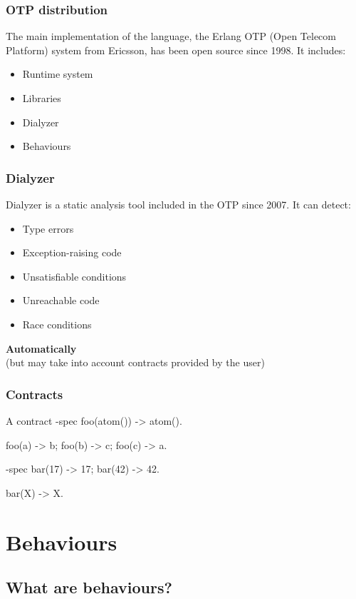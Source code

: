 \documentclass{beamer}
\begin{document}
\begin{frame}
  \frametitle{OTP distribution} The main implementation of the
  language, the Erlang OTP (Open Telecom Platform) system from
  Ericsson, has been open source since 1998.  \pause It includes:
  \begin{itemize}
  \item Runtime system
  \item Libraries
  \item Dialyzer
  \item Behaviours
  \end{itemize}
\end{frame}

\begin{frame}
  \frametitle{Dialyzer} Dialyzer is a static analysis tool included in
  the OTP since 2007. It can detect:
  \begin{itemize}
  \item Type errors
  \item Exception-raising code
  \item Unsatisfiable conditions
  \item Unreachable code
  \item Race conditions
  \end{itemize}
  \pause
  \begin{center}
    \textbf{Automatically} \\
    \small (but may take into account contracts provided by the user)
  \end{center}
\end{frame}

\begin{frame}[fragile]
  \frametitle{Contracts}
\begin{code}{A contract}
-spec foo(atom()) -> atom().

foo(a) -> b;
foo(b) -> c;
foo(c) -> a.

-spec bar(17) -> 17;
      bar(42) -> 42.

bar(X) -> X.
\end{code}
\end{frame}

\section{Behaviours}

\subsection{What are behaviours?}
\end{document}
